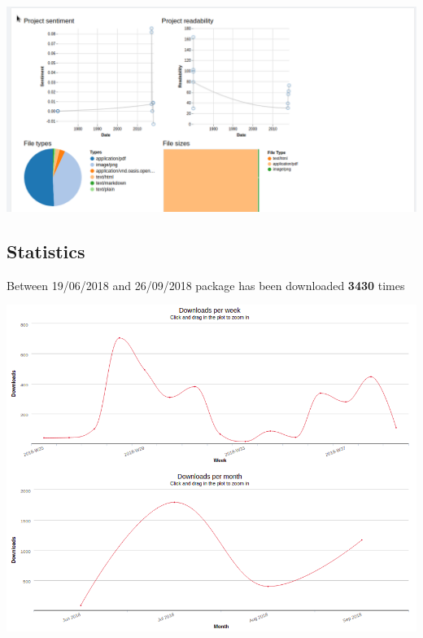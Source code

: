 \documentclass{article}
\begin{document}
\begin{center}
  \includegraphics[scale=0.5]{Screenshot_2018-09-28_11-44-09.png}
\end{center}

\pagebreak

\subsection{Statistics}

\begin{flushleft}
Between 19/06/2018 and 26/09/2018 package has been downloaded \textbf{3430} times
\end{flushleft}

\begin{center}
  \includegraphics[scale=0.5]{extensions.png}
\end{center}

\newpage
\end{document}
